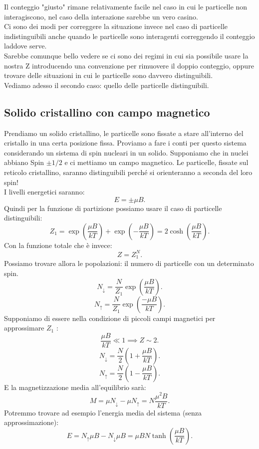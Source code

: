 Il conteggio "giusto" rimane relativamente facile nel caso in cui le particelle non interagiscono, nel caso della interazione sarebbe un vero casino.\\
Ci sono dei modi per correggere la situazione invece nel caso di particelle indistinguibili anche quando le particelle sono interagenti correggendo il conteggio laddove serve.\\
Sarebbe comunque bello vedere se ci sono dei regimi in cui sia possibile usare la nostra Z introducendo una convenzione per rimuovere il doppio conteggio, oppure trovare delle situazioni in cui le particelle sono davvero distinguibili.\\
Vediamo adesso il secondo caso: quello delle particelle distinguibili.\\
\subsection{Solido cristallino con campo magnetico}%
Prendiamo un solido cristallino, le particelle sono fissate a stare all'interno del cristallo in una certa posizione fissa. Proviamo a fare i conti per questo sistema considerando un sistema di spin nucleari in un solido. Supponiamo che in nuclei abbiano Spin $\pm 1 /2$ e ci mettiamo un campo magnetico. Le particelle, fissate sul reticolo cristallino, saranno distinguibili perché si orienteranno a seconda del loro spin!\\
I livelli energetici saranno:
\[
	E = \pm \mu B
.\] 
Quindi per la funzione di partizione possiamo usare il caso di particelle distinguibili:
\[
	Z_1 = \exp\left( \frac{\mu B}{kT} \right) + \exp \left( - \frac{\mu B}{kT} \right) = 2 \cosh\left( \frac{\mu B}{kT} \right) 
.\] 
Con la funzione totale che è invece:
\[
	Z = Z_1^{N}
.\] 
Possiamo trovare allora le popolazioni: il numero di particelle con un determinato spin.
\[
	N_{\downarrow} = \frac{N}{Z_1}\exp{\left( \frac{\mu B}{kT} \right) }
.\] 
\[
	N_{\uparrow} = \frac{N}{Z_1}\exp{\left( \frac{-\mu B}{kT} \right) }
.\] 
Supponiamo di essere nella condizione di piccoli campi magnetici per approssimare $Z_1$ :
\[
	\frac{\mu B}{kT}\ll 1 \implies Z\sim 2
.\] 
\[
	N_{\downarrow}=\frac{N}{2} \left( 1 + \frac{\mu B}{kT} \right) 
.\] 
\[
	N_{\uparrow}=\frac{N}{2} \left( 1 - \frac{\mu B}{kT} \right) 
.\] 
E la magnetizzazione media all'equilibrio sarà:
\[
	M = \mu N_{\downarrow} -\mu N_{\uparrow}= N \frac{\mu^2 B}{kT}
.\] 
Potremmo trovare ad esempio l'energia media del sistema (senza approssimazione):
\[
	E = N_{\uparrow}\mu B- N_{\downarrow} \mu B = \mu B N \tanh \left( \frac{\mu B}{kT} \right) 
.\]  
